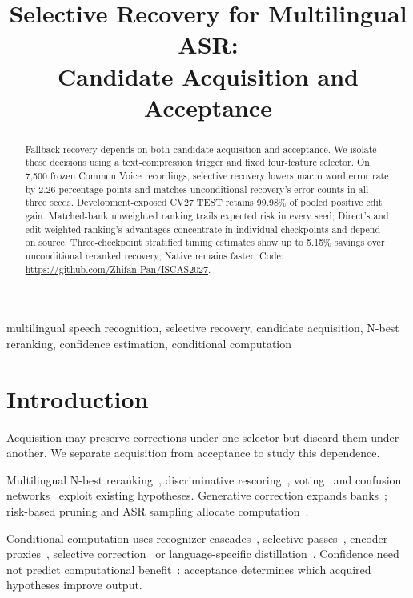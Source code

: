 \documentclass[conference,letterpaper]{IEEEtran}
\title{Selective Recovery for Multilingual ASR:\\Candidate Acquisition and Acceptance}
\begin{document}
\maketitle\flushbottom
\setlength{\parskip}{0pt plus 4pt}
\begin{abstract}
Fallback recovery depends on both candidate acquisition and acceptance. We isolate these decisions using a text-compression trigger and fixed four-feature selector. On 7,500 frozen Common Voice recordings, selective recovery lowers macro word error rate by 2.26 percentage points and matches unconditional recovery's error counts in all three seeds. Development-exposed CV27 TEST retains 99.98\% of pooled positive edit gain. Matched-bank unweighted ranking trails expected risk in every seed; Direct's and edit-weighted ranking's advantages concentrate in individual checkpoints and depend on source. Three-checkpoint stratified timing estimates show up to 5.15\% savings over unconditional reranked recovery; Native remains faster. Code: \url{https://github.com/Zhifan-Pan/ISCAS2027}.
\end{abstract}
\begin{IEEEkeywords}
multilingual speech recognition, selective recovery, candidate acquisition, N-best reranking, confidence estimation, conditional computation
\end{IEEEkeywords}

\section{Introduction}
Acquisition may preserve corrections under one selector but discard them under another. We separate acquisition from acceptance to study this dependence.

Multilingual N-best reranking~\cite{gaur2022,yan2025wild}, discriminative rescoring~\cite{rescorebert,discriminative2023,audioattention2019}, voting~\cite{fiscus1997} and confusion networks~\cite{mangu2000} exploit existing hypotheses. Generative correction expands banks~\cite{kuo2026framework,dutta2022,progres2024,whisperingllama}; risk-based pruning and ASR sampling allocate computation~\cite{cheng2023pruning,jinnai2025mbrasr}.

Conditional computation uses recognizer cascades~\cite{xue2025sima}, selective passes~\cite{aleksic2025}, encoder proxies~\cite{fathullah2024proxies}, selective correction~\cite{lim2025hybrid} or language-specific distillation~\cite{ferraz2024distil}. Confidence need not predict computational benefit~\cite{jitkrittum2023cascade}: acceptance determines which acquired hypotheses improve output.
\end{document}
